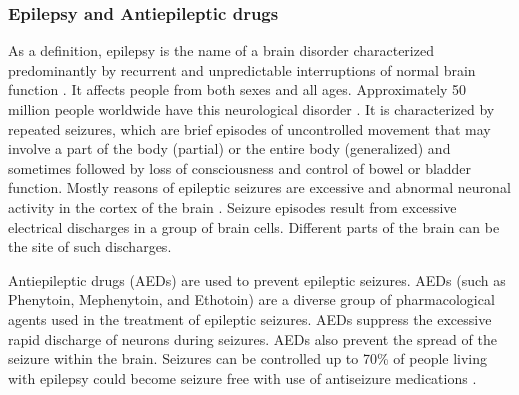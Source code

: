 \frametitle{Epilepsy and Antiepileptic drugs}
\par As a definition, epilepsy is the name of a brain disorder characterized predominantly by recurrent and unpredictable interruptions of normal brain function \cite{fisher2005epileptic}. It affects people from both sexes and all ages. Approximately 50 million people worldwide have this neurological disorder \cite{world2006neurological}. It is characterized by repeated seizures, which are brief episodes of uncontrolled movement that may involve a part of the body (partial) or the entire body (generalized) and sometimes followed by loss of consciousness and control of bowel or bladder function. Mostly reasons of epileptic seizures are excessive and abnormal neuronal activity in the cortex of the brain \cite{fisher2005epileptic}. Seizure episodes result from excessive electrical discharges in a group of brain cells. Different parts of the brain can be the site of such discharges.
\newline
\par Antiepileptic drugs (AEDs) are used to prevent epileptic seizures. AEDs (such as Phenytoin, Mephenytoin, and Ethotoin) are a diverse group of pharmacological agents used in the treatment of epileptic seizures. AEDs suppress the excessive rapid discharge of neurons during seizures. AEDs also prevent the spread of the seizure within the brain. Seizures can be controlled up to 70\% of people living with epilepsy could become seizure free with use of antiseizure medications \cite{sander1993some}.